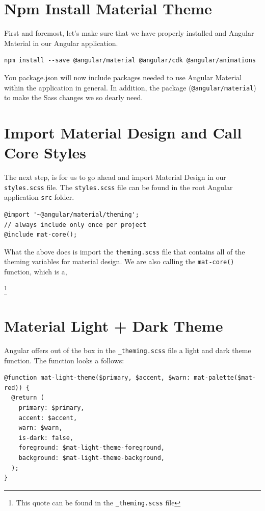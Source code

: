 \section{Npm Install Material Theme}
First and foremost, let's make sure that we have properly installed and Angular
Material in our Angular application. 
\begin{lstlisting}
npm install --save @angular/material @angular/cdk @angular/animations
\end{lstlisting}

You package.json will now include packages needed to use Angular Material 
within the application in general. In addition, the package
(\lstinline{@angular/material}) to make the Sass changes we so dearly need. 

\section{Import Material Design and Call Core Styles}
The next step, is for us to go ahead and import Material Design in our 
\lstinline{styles.scss} file. The \lstinline{styles.scss} file can be found
in the root Angular application \lstinline{src} folder.

\begin{lstlisting}[caption=styles.scss]
@import '~@angular/material/theming';
// always include only once per project
@include mat-core();
\end{lstlisting}


What the above does is import the \lstinline{theming.scss} file that contains
all of the theming variables for material design. We are also calling the
\lstinline{mat-core()} function, which is a, \begin{quote}
\end{quote} \footnote{This quote can be found in the \lstinline{_theming.scss}
file}

\section{Material Light + Dark Theme}
Angular offers out of the box in the \lstinline{_theming.scss} file a light and
dark theme function. The function looks a follows: 
\begin{lstlisting}
@function mat-light-theme($primary, $accent, $warn: mat-palette($mat-red)) {
  @return (
    primary: $primary,
    accent: $accent,
    warn: $warn,
    is-dark: false,
    foreground: $mat-light-theme-foreground,
    background: $mat-light-theme-background,
  );
}  
\end{lstlisting}

